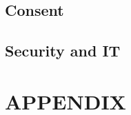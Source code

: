 \documentclass[12pt,titlepage]{article}
\begin{document}



\subsection{Consent}
\label{sec:consent}


\subsection{Security and IT}
\label{sec:security}


	\singlespacing
	 \nocite{*}
	
	

\clearpage
\appendix
\section*{APPENDIX}
\setcounter{section}{1}
\label{sec:appendix}

\end{document}
